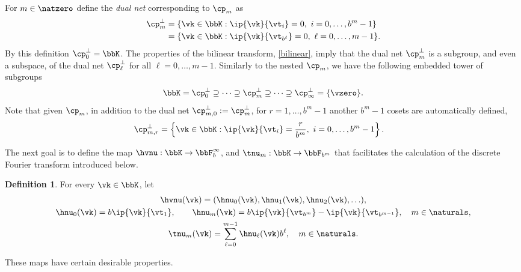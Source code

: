 \documentclass[]{elsarticle}
\theoremstyle{definition}
\newtheorem{defin}{Definition}
\begin{document}
For $m \in \natzero$ define the \emph{dual net} corresponding to $\cp_m$ as
\begin{align*}
\cp^{\perp}_m &= \{\vk \in \bbK : \ip{\vk}{\vt_i} = 0, \ i=0, \ldots, b^m-1\} \\
&= \{\vk \in \bbK : \ip{\vk}{\vt_{b^{\ell}}} = 0, \ \ell=0, \ldots, m-1\}.
\end{align*}
By this definition $\cp^{\perp}_{0}=\bbK$.  The properties of the bilinear transform, \eqref{bilinear}, imply that the dual net $\cp^{\perp}_m$ is a subgroup, and even a subspace, of the dual net $\cp^{\perp}_\ell$ for all $\ell=0, \ldots, m-1$. Similarly to the nested $\cp_m$, we have the following embedded tower of subgroups
\begin{align*}
\bbK=\cp^{\perp}_0\supseteq\dots\supseteq\cp^{\perp}_m\supseteq\dots\supseteq\cp^{\perp}_\infty=\{\vzero\}.
\end{align*}
Note that given $\cp_m$, in addition to the dual net $\cp^{\perp}_{m,0}:=\cp^{\perp}_{m}$, for $r=1,\dots,b^m-1$ another $b^m-1$ cosets are automatically defined,
\begin{align*}
\cp^{\perp}_{m,r} &= \left\{\vk \in \bbK : \ip{\vk}{\vt_i} = \frac{r}{b^m}, \ i=0, \ldots, b^m-1\right\}.
\end{align*}

The next goal is to define the map $\hvnu : \bbK \to \bbF_b^{\infty}$, and $\tnu_m : \bbK \to \bbF_{b^m}$ that facilitates the calculation of the discrete Fourier transform introduced below.

\begin{defin} \label{numapdef} For every $\vk \in \bbK$, let
\begin{subequations} \label{numapdefeq}
\begin{gather}
\hvnu(\vk)=(\hnu_0(\vk), \hnu_1(\vk), \hnu_2(\vk), \ldots ), \\
\hnu_0(\vk) = b\ip{\vk}{\vt_{1}}, \qquad \hnu_m(\vk)=b\ip{\vk}{\vt_{b^m}}-\ip{\vk}{\vt_{b^{m-1}}}, \quad m \in \naturals, \\
\tnu_m(\vk) = \sum_{\ell=0}^{m-1} \hnu_{\ell}(\vk) b^{\ell}, \quad m \in \naturals.
\end{gather}
\end{subequations}
\end{defin}

These maps have certain desirable properties.
\end{document}
